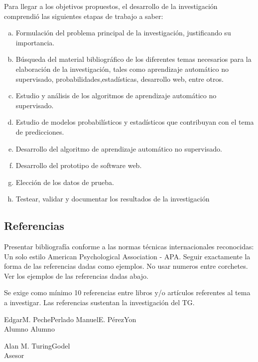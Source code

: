 \documentclass[a4paper, 12pt]{article}
\begin{document}
\vskip 0.1cm
Para llegar a los objetivos propuestos, el desarrollo de la investigación comprendió las siguientes etapas de trabajo a saber:
\begin{enumerate} [a)]
\item Formulación del problema principal de la investigación, justificando su importancia.
\item Búsqueda del material bibliográfico de los diferentes temas necesarios para la elaboración de la investigación, tales como aprendizaje automático no supervisado, probabilidades,estadísticas, desarrollo web, entre otros.
\item Estudio y análisis de los algoritmos de aprendizaje automático no supervisado.
\item Estudio de modelos probabilísticos y estadísticos que contribuyan con el tema de predicciones.
\item Desarrollo del algoritmo de aprendizaje automático no supervisado.
\item Desarrollo del prototipo de software web.
\item Elección de los datos de prueba.
\item Testear, validar y documentar los resultados de la investigación
\end{enumerate}
   


\subsection{Referencias}
Presentar bibliografía conforme a las normas técnicas internacionales reconocidas: Un solo estilo American Psychological Association - APA. Seguir exactamente la forma de las referencias dadas como ejemplos. No usar numeros entre corchetes. Ver los ejemplos de las referencias dadas abajo.\par
\vskip 0.3cm
Se exige como mínimo 10 referencias entre libros y/o artículos referentes al tema a investigar. Las referencias sustentan la investigación del TG.



\vskip 1cm

\hspace{0.7cm}Edgar\hspace{.1cm}M.\hspace{.1cm} Peche\hspace{.1cm}Perlado 
\hspace{4cm}Manuel\hspace{.1cm}E.\hspace{.1cm} Pérez\hspace{.1cm}Yon \\
\hspace*{2.6cm} Alumno  \hspace*{6.6cm}Alumno


\vskip 1cm
\begin{center}
Alan \hspace{.1cm}M.\hspace{.1cm} Turing\hspace{.1cm}Godel\\
 Asesor
\end{center}
\end{document}
